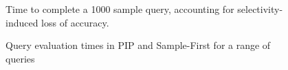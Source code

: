 

\begin{figure}
\begin{center}
\caption{Time to complete a 1000 sample query, accounting for selectivity-induced loss of accuracy.}
\label{fig:scaling_selectivity}
\end{center}
\end{figure}


\begin{figure}
\begin{center}
\caption{Query evaluation times in PIP and Sample-First for a range of queries}
\label{fig:querytimings}
\end{center}
\end{figure}

